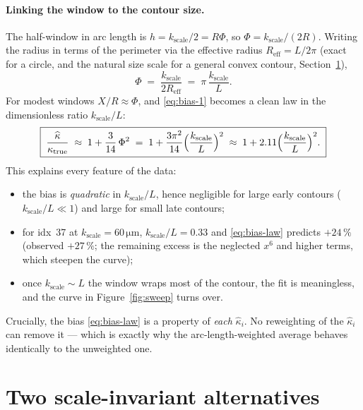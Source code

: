 \documentclass[11pt]{article}
\newcommand{\um}{\si{\micro\meter}}
\begin{document}
\paragraph{Linking the window to the contour size.}
The half-window in arc length is $h=k_{\text{scale}}/2 = R\Phi$, so
$\Phi = k_{\text{scale}}/(2R)$. Writing the radius in terms of the perimeter via
the effective radius $R_{\text{eff}} = L/2\pi$ (exact for a circle, and the
natural size scale for a general convex contour, Section~\ref{sec:turning}),
\begin{equation}
  \Phi \;=\; \frac{k_{\text{scale}}}{2R_{\text{eff}}}
        \;=\; \pi\,\frac{k_{\text{scale}}}{L}.
\end{equation}
For modest windows $X/R\approx\Phi$, and \eqref{eq:bias-1} becomes a clean law in
the dimensionless ratio $k_{\text{scale}}/L$:
\begin{equation}
  \boxed{\;
  \frac{\widehat{\kappa}}{\kappa_{\text{true}}}
  \;\approx\; 1 + \frac{3}{14}\,\Phi^2
  \;=\; 1 + \frac{3\pi^2}{14}\Bigl(\frac{k_{\text{scale}}}{L}\Bigr)^2
  \;\approx\; 1 + 2.11\Bigl(\frac{k_{\text{scale}}}{L}\Bigr)^2 .
  \;}
  \label{eq:bias-law}
\end{equation}
This explains every feature of the data:
\begin{itemize}
  \item the bias is \emph{quadratic} in $k_{\text{scale}}/L$, hence negligible
    for large early contours ($k_{\text{scale}}/L\!\ll\!1$) and large for small
    late contours;
  \item for idx~37 at $k_{\text{scale}}=60\,\um$, $k_{\text{scale}}/L=0.33$ and
    \eqref{eq:bias-law} predicts $+24\,\%$ (observed $+27\,\%$; the remaining
    excess is the neglected $x^6$ and higher terms, which steepen the curve);
  \item once $k_{\text{scale}}\sim L$ the window wraps most of the contour, the
    fit is meaningless, and the curve in Figure~\ref{fig:sweep} turns over.
\end{itemize}

Crucially, the bias \eqref{eq:bias-law} is a property of \emph{each}
$\widehat{\kappa}_i$. No reweighting of the $\widehat{\kappa}_i$ can remove it ---
which is exactly why the arc-length-weighted average behaves identically to the
unweighted one.

\section{Two scale-invariant alternatives}
\label{sec:turning}
\end{document}
